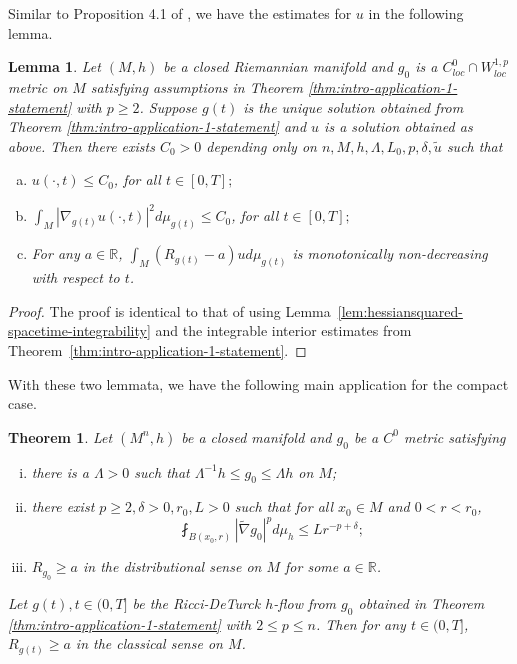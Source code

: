 \documentclass[12pt]{amsart}
\theoremstyle{plain}
\newtheorem{theorem}[subsection]{Theorem}
\theoremstyle{plain}
\newtheorem{lemma}[subsection]{Lemma}
\theoremstyle{definition}
\theoremstyle{remark}
\numberwithin{equation}{subsection}
\newcommand{\del}{\nabla}
\newcommand{\hdel}{\tilde{\nabla}}
\begin{document}
Similar to Proposition 4.1 of \cite{jiang_weak_2021}, we have the estimates for $u$ in the following lemma.
\begin{lemma}\label{lem:conjugate-heat-equation-estimates}
    Let $(M,h)$ be a closed Riemannian manifold and $g_0$ is a $C^0_{loc}\cap W^{1,p}_{loc}$ metric on $M$ satisfying assumptions in Theorem \ref{thm:intro-application-1-statement} with $p\geq 2$. Suppose $g(t)$ is the unique solution obtained from Theorem \ref{thm:intro-application-1-statement} and $u$ is a solution obtained as above. Then there exists $C_0>0$ depending only on $n,M,h,\Lambda,L_0,p,\delta,\tilde u$ such that
    \begin{enumerate}[(a)]
        \item $u(\cdot,t) \leq C_0$, for all $t \in [0,T];$
        \item $\displaystyle\int_M |\del_{g(t)} u(\cdot,t)|^2 d\mu_{g(t)} \leq C_0$, for all $t \in [0,T];$
        \item For any $a\in \mathbb{R}$, $\displaystyle\int_M (R_{g(t)} - a)u d\mu_{g(t)}$ is monotonically non-decreasing with respect to $t$.
    \end{enumerate}
\end{lemma}
\begin{proof}
The proof is identical to that of \cite[Proposition 4.1]{jiang_weak_2021} using Lemma~\ref{lem:hessiansquared-spacetime-integrability} and the integrable interior estimates from Theorem~\ref{thm:intro-application-1-statement}.
\end{proof}

With these two lemmata, we have the following main application for the compact case. 

\begin{theorem}\label{thm:preservation-distributional-scalar-curvature-lower-bound}
    Let $(M^n,h)$ be a  closed manifold and $g_0$ be a $C^0$ metric satisfying
    \begin{enumerate}[(i)]
        \item there is a $\Lambda > 0$ such that $\Lambda^{-1}h \leq g_0 \leq \Lambda h$ on $M$;
        \item there exist $p \geq 2, \delta > 0, r_0 ,L> 0$ such that for all $x_0 \in M$ and $0 < r < r_0$,
        \begin{equation}
            \fint_{B(x_0, r)} |\hdel g_0|^p d\mu_h \leq L r^{-p + \delta};
        \end{equation}
   \item $R_{g_0}\geq a$ in the distributional sense on $M$ for some $a\in \mathbb{R}$.
    \end{enumerate}
    Let $g(t), t \in (0, T]$ be the Ricci-DeTurck $h$-flow from $g_0$ obtained in Theorem \ref{thm:intro-application-1-statement} with $2 \leq p \leq n$. Then for any $t \in (0, T]$, $R_{g(t)} \geq a$ in the classical sense on $M$.
\end{theorem}
\end{document}
